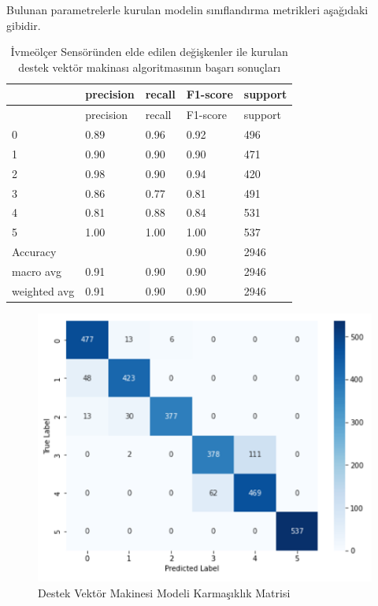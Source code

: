 \documentclass[12pt,twoside]{deuthesis}
\begin{document}
Bulunan parametrelerle kurulan modelin sınıflandırma metrikleri aşağıdaki gibidir.
\begin{longtable}[]{@{}lllll@{}}
\caption{\label{tab:isvm} İvmeölçer Sensöründen elde edilen değişkenler ile kurulan destek vektör makinası algoritmasının başarı sonuçları}\tabularnewline
\toprule()
& precision & recall & F1-score & support \\
\midrule()
\endfirsthead
\toprule()
& precision & recall & F1-score & support \\
\midrule()
\endhead
0 & 0.89 & 0.96 & 0.92 & 496 \\
1 & 0.90 & 0.90 & 0.90 & 471 \\
2 & 0.98 & 0.90 & 0.94 & 420 \\
3 & 0.86 & 0.77 & 0.81 & 491 \\
4 & 0.81 & 0.88 & 0.84 & 531 \\
5 & 1.00 & 1.00 & 1.00 & 537 \\
Accuracy & & & 0.90 & 2946 \\
macro avg & 0.91 & 0.90 & 0.90 & 2946 \\
weighted avg & 0.91 & 0.90 & 0.90 & 2946 \\
\bottomrule()
\end{longtable}
\begin{figure}

{\centering \includegraphics[width=0.9\linewidth,height=0.35\textheight]{figure/isvm_confmat} 

}

\caption{Destek Vektör Makinesi Modeli Karmaşıklık Matrisi}\label{fig:isvmconfmat}
\end{figure}
\end{document}
